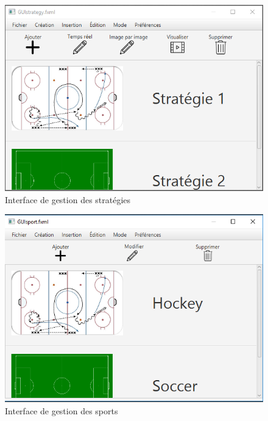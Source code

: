 \begin{figure}[htpb]
    \centering
    \includegraphics[scale=0.7]{fig/gui/gui_strategie.png}
    \caption{Interface de gestion des stratégies}
    \label{fig:gui:gui_strategie}
\end{figure}

\begin{figure}[htpb]
    \centering
    \includegraphics[scale=0.7]{fig/gui/gui_sport.png}
    \caption{Interface de gestion des sports}
    \label{fig:gui:gui_sport}
\end{figure}

